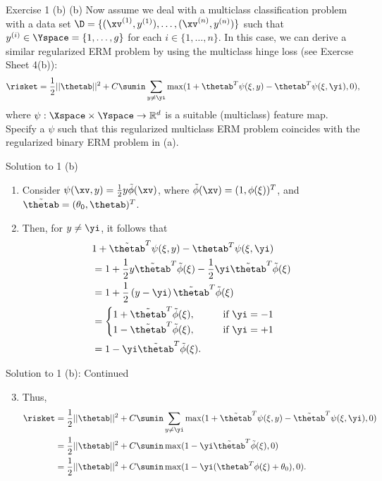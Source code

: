 \documentclass[aspectratio=169]{beamer}
\newcommand{\phitxi}{\tilde{\phi}(\xi)}
\renewcommand{\phixi}{\phi(\xi)}
\newcommand{\psixiy}{\psi(\xi, y)}
\newcommand{\psixiyi}{\psi(\xi, \yi)}
\newcommand{\thetabt}{\tilde{\thetab}}
\begin{document}
\begin{frame}{Exercise 1 (b)}
	(b) Now assume we deal with a multiclass classification problem with a data set $\D = \{(\xv^{(1)}, y^{(1)}), \ldots, (\xv^{(n)}, y^{(n)})\}$ such that $y^{(i)} \in \Yspace = \{1, \ldots, g \}$ for each $i \in \{1, \ldots, n \}$. In this case, we can derive a similar regularized ERM problem by using the multiclass hinge loss (see Exercse Sheet 4(b)):
	$$\risket = \frac{1}{2} || \thetab||^2 + C \sumin \sum_{y\neq \yi} \max (1 + \thetab^T \psi (\xi, y) - \thetab^T \psi(\xi, \yi), 0),$$
	where $\psi: \Xspace \times \Yspace \to \mathbb{R}^d$ is a suitable (multiclass) feature map. Specify a $\psi$ such that this regularized multiclass ERM problem coincides with the regularized binary ERM problem in (a).
\end{frame}

\begin{frame}{Solution to 1 (b)}
	\begin{enumerate}
		\item Consider $\psi(\xv, y) = \frac{1}{2} y \tilde{\phi}(\xv)$, where $\tilde{\phi}(\xv) = (1, \phixi)^T$, and $\thetabt = (\theta_0, \thetab)^T$.
		\item Then, for $y \neq \yi$, it follows that 
				\begin{align*}
					& 1 + \thetabt^T \psixiy - \thetab^T \psixiyi \\
					&= 1 + \frac{1}{2} y \thetabt^T \phitxi - \frac{1}{2} \yi \thetabt^T \phitxi \\
					&= 1 + \frac{1}{2} \left(y - \yi \right) \thetabt^T \phitxi \\
					&= \begin{cases}
						1 + \thetabt^T \phitxi, \qquad &\text{if} \ \yi = - 1 \\
						1 - \thetabt^T \phitxi, \qquad &\text{if} \ \yi = +1 \\
					\end{cases} \\
					&= 1 - \yi \thetabt^T \phitxi. \\
				\end{align*}
	\end{enumerate}
\end{frame}

\begin{frame}{Solution to 1 (b): Continued}
	\begin{enumerate}
		\setcounter{enumi}{2}
		\item Thus, 
				\begin{align*}
					\risket &= \frac{1}{2}||\thetab||^2 + C \sumin \sum_{y \neq \yi} \max(1 + \thetabt^T \psixiy - \thetabt^T \psixiyi, 0) \\
					&= \frac{1}{2} ||\thetab||^2 + C \sumin \max(1 - \yi \thetabt^T\phitxi, 0) \\
					&= \frac{1}{2} ||\thetab||^2 + C \sumin \max(1 - \yi (\thetab^T \phixi + \theta_0), 0).
				\end{align*}
	\end{enumerate}
\end{frame}
\end{document}
